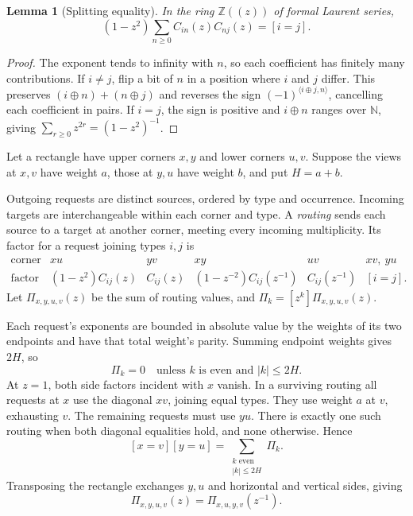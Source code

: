 \documentclass[11pt]{article}
\newtheorem{lemma}[theorem]{Lemma}
\theoremstyle{definition}
\theoremstyle{remark}
\newcommand{\Z}{\mathbb Z}
\newcommand{\N}{\mathbb N}
\newcommand{\ip}[2]{\langle #1,#2\rangle}
\begin{document}
\begin{lemma}[Splitting equality]\label{lem:equality}
In the ring $\Z((z))$ of formal Laurent series,
\[
 (1-z^2)\sum_{n\ge0}C_{in}(z)C_{nj}(z)=[i=j].
\]
\end{lemma}

\begin{proof}
The exponent tends to infinity with $n$, so each coefficient has finitely many contributions. If $i\ne j$, flip a bit of $n$ in a position where $i$ and $j$ differ. This preserves $(i\oplus n)+(n\oplus j)$ and reverses the sign $(-1)^{\ip{i\oplus j}n}$, cancelling each coefficient in pairs. If $i=j$, the sign is positive and $i\oplus n$ ranges over $\N$, giving $\sum_{r\ge0}z^{2r}=(1-z^2)^{-1}$.
\end{proof}

Let a rectangle have upper corners $x,y$ and lower corners $u,v$. Suppose the views at $x,v$ have weight $a$, those at $y,u$ have weight $b$, and put $H=a+b$.

Outgoing requests are distinct sources, ordered by type and occurrence. Incoming targets are interchangeable within each corner and type. A \emph{routing} sends each source to a target at another corner, meeting every incoming multiplicity. Its factor for a request joining types $i,j$ is
\begin{equation}\label{eq:rules}
\begin{array}{c|ccccc}
\text{corner pair}&xu&yv&xy&uv&xv,\ yu\\ \hline
\text{factor}&(1-z^2)C_{ij}(z)&C_{ij}(z)&
 (1-z^{-2})C_{ij}(z^{-1})&C_{ij}(z^{-1})&[i=j].
\end{array}
\end{equation}
Let $\Pi_{x,y,u,v}(z)$ be the sum of routing values, and $\Pi_k=[z^k]\Pi_{x,y,u,v}(z)$.

Each request's exponents are bounded in absolute value by the weights of its two endpoints and have that total weight's parity. Summing endpoint weights gives $2H$, so
\begin{equation}\label{eq:grades}
 \Pi_k=0\quad\text{unless }k\text{ is even and }|k|\le2H.
\end{equation}
At $z=1$, both side factors incident with $x$ vanish. In a surviving routing all requests at $x$ use the diagonal $xv$, joining equal types. They use weight $a$ at $v$, exhausting $v$. The remaining requests must use $yu$. There is exactly one such routing when both diagonal equalities hold, and none otherwise. Hence
\begin{equation}\label{eq:cross}
 [x=v][y=u]=\sum_{\substack{k\text{ even}\\|k|\le2H}}\Pi_k.
\end{equation}
Transposing the rectangle exchanges $y,u$ and horizontal and vertical sides, giving
\begin{equation}\label{eq:transpose}
 \Pi_{x,y,u,v}(z)=\Pi_{x,u,y,v}(z^{-1}).
\end{equation}
\end{document}
